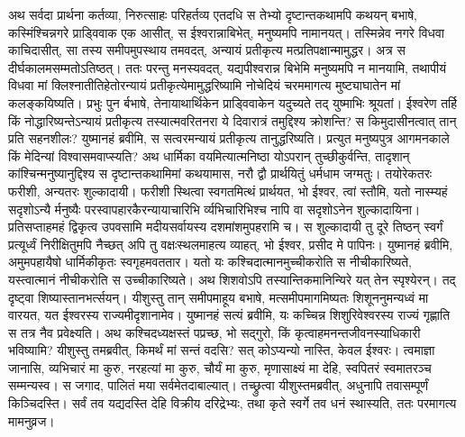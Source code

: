\adhyAya
{}
\vakya अथ सर्वदा प्रार्थना कर्तव्या, निरुत्साहः परिहर्तव्य एतदधि स तेभ्यो दृष्टान्तकथामपि कथयन् बभाषे,
\vakya कस्मिंश्चिन्नगरे प्राड्विवाक एक आसीत्, स ईश्वरान्नाबिभेत्, मनुष्यमपि नामानयत्।
\vakya तस्मिन्नेव नगरे विधवा काचिदासीत्, सा तस्य समीपमुपस्थाय तमवदत्, अन्यायं प्रतीकृत्य मत्प्रतिपक्षान्मामुद्धर।
\vakya अत्र स दीर्घकालमसम्मतोऽतिष्ठत्। ततः परन्तु मनस्यवदत्, यद्यपीश्वरान्न बिभेमि मनुष्यमपि न मानयामि,
\vakya तथापीयं विधवा मां क्लिश्नातीतिहेतोरन्यायं प्रतीकृत्येमामुद्धरिष्यामि नोचेदियं चरममागत्य मुष्ट्याघातेन मां कलङ्कयिष्यति।
\vakya प्रभुः पुन र्बभाषे, तेनायाथार्थिकेन प्राड्विवाकेन यदुच्यते तद् युष्माभिः श्रूयतां।
\vakya ईश्वरेण तर्हि किं नोद्धारिष्यन्तेऽन्यायं प्रतीकृत्य तस्यात्मवरितनरा ये दिवारात्रं तमुद्दिश्य क्रोशन्ति? स किमुदासीनत्वात् तान् प्रति सहनशीलः?
\vakya युष्मानहं ब्रवीमि, स सत्वरमन्यायं प्रतीकृत्य तानुद्धरिष्यति। प्रत्युत मनुष्यपुत्र आगमनकाले किं मेदिन्यां विश्वासमवाप्स्यति?
\vakya अथ धार्मिका वयमित्यात्मनिष्ठा योऽपरान् तुच्छीकुर्वन्ति, तादृशान् कांश्चिन्मनुष्यानुद्दिश्य स दृष्टान्तकथामिमां कथयामास,
\vakya नरौ द्वौ प्रार्थयितुं धर्मधाम जग्मतुः। तयोरेकतरः फरीशी, अन्यतरः शुल्कादायी।
\vakya फरीशी स्थित्वा स्वगतमित्थं प्रार्थयत, भो ईश्वर, त्वां स्तौमि, यतो नास्म्यहं सदृशोऽन्यै र्मनुष्यैः परस्वापहारकैरन्यायाचारिभि र्व्यभिचारिभिश्च नापि वा सदृशोऽनेन शुल्कादायिना।
\vakya प्रतिसप्ताहमहं द्विकृत्व उपवसामि मदीयसर्वायस्य दशमांशमुपहरामि च।
\vakya स शुल्कादायी तु दूरे तिष्ठन् स्वर्गं प्रत्यूर्ध्वं निरीक्षितुमपि नैच्छत् अपि तु वक्षःस्थलमाहत्य व्याहत्, भो ईश्वर, प्रसीद मे पापिनः।
\vakya युष्मानहं ब्रवीमि, अमुमपहायैषो धार्मिकीकृतः स्वगृहमवततार। यतो यः कश्चिदात्मानमुच्चीकरोति स नीचीकारिष्यते, यस्त्वात्मानं नीचीकरोति स उच्चीकारिष्यते।
\vakya अथ शिशवोऽपि तस्यान्तिकमानिन्यिरे यत् तेन स्पृश्येरन्। तद् दृष्ट्वा शिष्यास्तानभर्त्सयन्।
\vakya यीशुस्तु तान् समीपमाहूय बभाषे, मत्समीपमागमिष्यतः शिशूननुमन्यध्वं मा वारयत, यत ईश्वरस्य राज्यमीदृशानामेव।
\vakya युष्मानहं सत्यं ब्रवीमि, यः कच्चिन्न शिशुरिवेश्वरस्य राज्यं गृह्णाति स तत्र नैव प्रवेक्ष्यति।
\vakya अथ कश्चिदध्यक्षस्तं पप्रच्छ, भो सद्गुरो, किं कृत्वाहमनन्तजीवनस्याधिकारी भविष्यामि?
\vakya यीशुस्तु तमब्रवीत्, किमर्थं मां सन्तं वदसि? सत् कोऽप्यन्यो नास्ति, केवल ईश्वरः।
\vakya त्वमाज्ञा जानासि, व्यभिचारं मा कुरु, नरहत्यां मा कुरु, चौर्यं मा कुरु, मृणासाक्ष्यं मा देहि, स्वपितरं स्वमातरञ्च सम्मन्यस्व।
\vakya स जगाद, पालितं मया सर्वमेतदाबाल्यात्।
\vakya तच्छ्रुत्वा यीशुस्तमब्रवीत्, अधुनापि तवासम्पूर्णं किञ्चिदस्ति। सर्वं तव यद्यदस्ति देहि विक्रीय दरिद्रेभ्यः, तथा कृते स्वर्गे तव धनं स्थास्यति, ततः परमागत्य मामनुव्रज।
